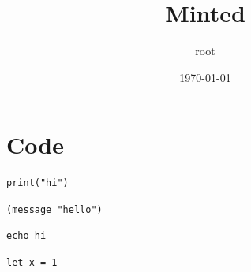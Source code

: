 \documentclass[11pt]{article}
\author{root}
\date{\today}
\title{Minted}
\begin{document}
\maketitle
\tableofcontents

\listoflistings

\section{Code}
\label{sec:org050b5d7}
\begin{verbatim}
print("hi")
\end{verbatim}

\begin{listing}[htbp]
\begin{verbatim}
(message "hello")
\end{verbatim}
\caption{\label{lst:org7c95b4a}A captioned listing}
\end{listing}

\begin{listing}[t]
\begin{verbatim}
echo hi
\end{verbatim}
\end{listing}

\begin{verbatim}
let x = 1
\end{verbatim}
\end{document}
